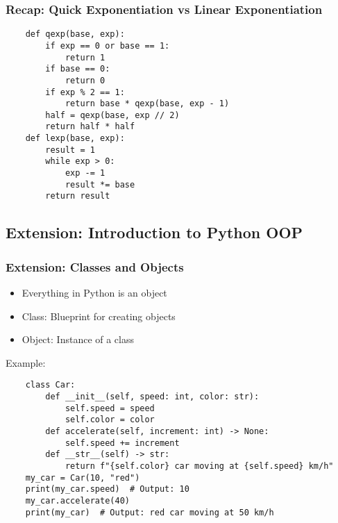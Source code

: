 \documentclass{beamer}
\begin{document}
\begin{frame}[fragile]
    \frametitle{Recap: Quick Exponentiation vs Linear Exponentiation}
              \begin{verbatim}
    def qexp(base, exp):
        if exp == 0 or base == 1:
            return 1
        if base == 0:
            return 0
        if exp % 2 == 1:
            return base * qexp(base, exp - 1)
        half = qexp(base, exp // 2)
        return half * half
    def lexp(base, exp):
        result = 1
        while exp > 0:
            exp -= 1
            result *= base
        return result
              \end{verbatim}
\end{frame}

\subsection{Extension: Introduction to Python OOP}
\begin{frame}[fragile]
    \frametitle{Extension: Classes and Objects}
    \begin{itemize}
        \item Everything in Python is an object
        \item Class: Blueprint for creating objects
        \item Object: Instance of a class              
    \end{itemize}

    Example:
    \begin{verbatim}
    class Car:
        def __init__(self, speed: int, color: str):
            self.speed = speed
            self.color = color
        def accelerate(self, increment: int) -> None:
            self.speed += increment        
        def __str__(self) -> str:
            return f"{self.color} car moving at {self.speed} km/h" 
    my_car = Car(10, "red")
    print(my_car.speed)  # Output: 10
    my_car.accelerate(40)
    print(my_car)  # Output: red car moving at 50 km/h
    \end{verbatim}
\end{frame}
\end{document}
